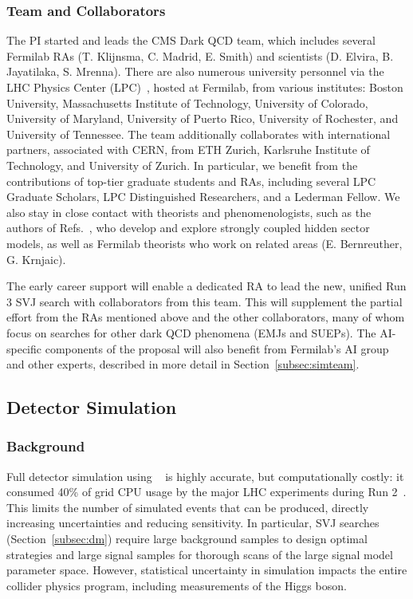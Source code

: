 \subsubsection{Team and Collaborators}\label{subsec:dmteam}

The PI started and leads the CMS Dark QCD team, which includes several Fermilab RAs (T. Klijnsma, C. Madrid, E. Smith) and scientists (D. Elvira, B. Jayatilaka, S. Mrenna).
There are also numerous university personnel via the LHC Physics Center (LPC)~\cite{LPC}, hosted at Fermilab, from various institutes:
Boston University, Massachusetts Institute of Technology, University of Colorado, University of Maryland, University of Puerto Rico, University of Rochester, and University of Tennessee.
The team additionally collaborates with international partners, associated with CERN, from ETH Zurich, Karlsruhe Institute of Technology, and University of Zurich.
In particular, we benefit from the contributions of top-tier graduate students and RAs, including several LPC Graduate Scholars, LPC Distinguished Researchers, and a Lederman Fellow.
We also stay in close contact with theorists and phenomenologists,
such as the authors of Refs.~\cite{Strassler:2006im,Cohen:2015toa,Schwaller:2015gea,Knapen:2016hky,Albouy:2022cin}, who develop and explore strongly coupled hidden sector models,
as well as Fermilab theorists who work on related areas (E. Bernreuther, G. Krnjaic).

The early career support will enable a dedicated RA to lead the new, unified Run 3 SVJ search with collaborators from this team.
This will supplement the partial effort from the RAs mentioned above and the other collaborators, many of whom focus on searches for other dark QCD phenomena (EMJs and SUEPs).
The AI-specific components of the proposal will also benefit from Fermilab's AI group and other experts, described in more detail in Section~\ref{subsec:simteam}.

\subsection{Detector Simulation}\label{subsec:sim}

\subsubsection{Background}\label{subsec:simbkg}

Full detector simulation using \GEANTfour~\cite{Agostinelli:2002hh} is highly accurate, but computationally costly:
it consumed 40\% of grid CPU usage by the major LHC experiments during Run 2~\cite{Apostolakis:2018ieg}.
This limits the number of simulated events that can be produced, directly increasing uncertainties and reducing sensitivity.
In particular, SVJ searches (Section~\ref{subsec:dm}) require large background samples to design optimal strategies
and large signal samples for thorough scans of the large signal model parameter space.
However, statistical uncertainty in simulation impacts the entire collider physics program, including measurements of the Higgs boson.


